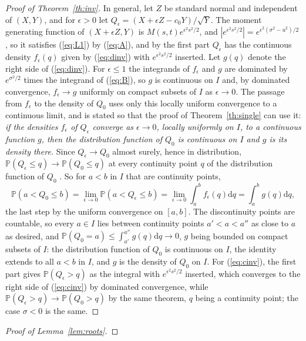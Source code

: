 \documentclass[ecta,nameyear,final]{econsocart}
\newcommand{\PP}{{\mathbb P}}
\newcommand{\dr}[1]{{\mathrm d}#1}
\theoremstyle{plain}
\theoremstyle{definition}
\begin{document}
\begin{appendix}
\begin{proof}[Proof of Theorem~\ref{th:inv}]
In general, let $Z$ be standard normal and independent of $(X,Y)$, and for $\epsilon>0$ let $Q_\epsilon=(X+\epsilon Z-c_0Y)/\sqrt Y$.  The moment generating function of $(X+\epsilon Z,Y)$ is $M(s,t)e^{\epsilon^2s^2/2}$, and $|e^{\epsilon^2s^2/2}|=e^{\epsilon^2(\sigma^2-u^2)/2}$, so it satisfies (\ref{eq:L1}) by (\ref{eq:A}), and by the first part $Q_\epsilon$ has the continuous density $f_\epsilon(q)$ given by (\ref{eq:dinv}) with $e^{\epsilon^2s^2/2}$ inserted.  Let $g(q)$ denote the right side of (\ref{eq:dinv}).  For $\epsilon\le1$ the integrands of $f_\epsilon$ and $g$ are dominated by $e^{\sigma^2/2}$ times the integrand of (\ref{eq:B}), so $g$ is continuous on $I$ and, by dominated convergence, $f_\epsilon\to g$ uniformly on compact subsets of $I$ as $\epsilon\to0$.  The passage from $f_\epsilon$ to the density of $Q_0$ uses only this locally uniform convergence to a continuous limit, and is stated so that the proof of Theorem~\ref{th:single} can use it: \emph{if the densities $f_\epsilon$ of $Q_\epsilon$ converge as $\epsilon\to0$, locally uniformly on $I$, to a continuous function $g$, then the distribution function of $Q_0$ is continuous on $I$ and $g$ is its density there.}  Since $Q_\epsilon\to Q_0$ almost surely, hence in distribution, $\PP(Q_\epsilon\le q)\to\PP(Q_0\le q)$ at every continuity point $q$ of the distribution function of $Q_0$ \citep[Theorem~25.2]{Billingsley1995}.  So for $a<b$ in $I$ that are continuity points,
\[
\PP(a<Q_0\le b)=\lim_{\epsilon\to0}\PP(a<Q_\epsilon\le b)=\lim_{\epsilon\to0}\int_a^bf_\epsilon(q)\dr{q}=\int_a^bg(q)\dr{q},
\]
the last step by the uniform convergence on $[a,b]$.  The discontinuity points are countable, so every $a\in I$ lies between continuity points $a'<a<a''$ as close to $a$ as desired, and $\PP(Q_0=a)\le\int_{a'}^{a''}g(q)\dr{q}\to0$, $g$ being bounded on compact subsets of $I$: the distribution function of $Q_0$ is continuous on $I$, the identity extends to all $a<b$ in $I$, and $g$ is the density of $Q_0$ on $I$.  For (\ref{eq:cinv}), the first part gives $\PP(Q_\epsilon>q)$ as the integral with $e^{\epsilon^2s^2/2}$ inserted, which converges to the right side of (\ref{eq:cinv}) by dominated convergence, while $\PP(Q_\epsilon>q)\to\PP(Q_0>q)$ by the same theorem, $q$ being a continuity point; the case $\sigma<0$ is the same.
\end{proof}\begin{proof}[Proof of Lemma~\ref{lem:roots}]

\end{proof}
\end{appendix}
\end{document}
